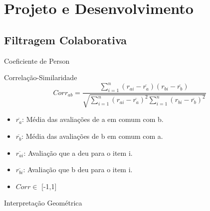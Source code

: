 \documentclass[xcolor=dvipsnames]{beamer}
\newcommand{\stringBoxSmall}[4]
{
	\draw [fill={#4},thick] (#1, #2) rectangle (#1 + 2.5, #2 + 0.5);	
	\node at (#1 + 1.25, #2 + 0.25) {#3};
}
\begin{document}

\section{Projeto e Desenvolvimento}
	\subsection{Filtragem Colaborativa}
		\begin{frame}{Coeficiente de Person}
			\begin{block}{Correlação-Similaridade}
		$$ Corr_{ab}=\frac{\sum_{i=1}^n (r_{ai} - \overline{r_a})(r_{bi} - \overline{r_b})}
		{\sqrt{\sum_{i=1}^n (r_{ai} - \overline{r_a})^2 \sum_{i=1}^n(r_{bi} - \overline{r_b})^2 } } $$	
			
	\begin{itemize}
		\item $\scriptstyle  \overline{r_a} $: {\scriptsize Média das avaliações de a em comum com b.}
		\item $ \scriptstyle \overline{r_b} $: {\scriptsize Média das avaliações de b em comum com a.}
		\item $ \scriptstyle \overline{r_{ai}} $: {\scriptsize Avaliação que a deu para o item i.}
		\item $ \scriptstyle \overline{r_{bi}} $: {\scriptsize Avaliação que b deu para o item i.}
		\item $ \scriptstyle Corr \in $ {\tiny [-1,1] }		
	\end{itemize}
			
	\end{block} 	
	
	\begin{block}{Interpretação Geométrica}
	\end{block}	
	\end{frame}
\end{document}
